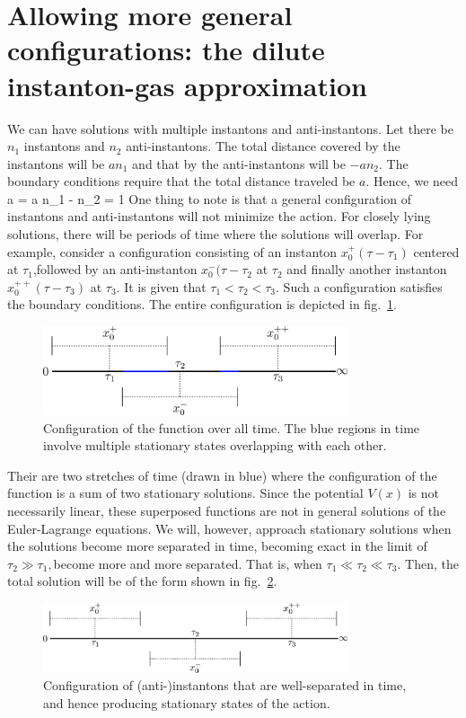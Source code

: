 \documentclass[12pt,onecolumn]{revtex4-2}
\begin{document}
\section{Allowing more general configurations: the dilute instanton-gas approximation}
We can have solutions with multiple instantons and anti-instantons. Let there be \(n_1\) instantons and \(n_2\) anti-instantons. The total distance covered by the instantons will be \(a n_1\) and that by the anti-instantons will be \(-a n_2\). The boundary conditions require that the total distance traveled be \(a\). Hence, we need 
\beq
 a  =  a \implies n_1 - n_2 = 1
\eeq
One thing to note is that a general configuration of instantons and anti-instantons will not minimize the action. For closely lying solutions, there will be periods of time where the solutions will overlap. For example, consider a configuration consisting of an instanton \(x_0^+(\tau - \tau_1)\) centered at \(\tau_1\),followed by an anti-instanton \(x_0^-(\tau - \tau_2\) at \(\tau_2\) and finally another instanton \(x_0^{++}(\tau - \tau_3)\) at \(\tau_3\). It is given that \(\tau_1 < \tau_2 < \tau_3\). Such a configuration satisfies the boundary conditions. The entire configuration is depicted in fig.~\ref{conf}.
\begin{figure}[htpb]
	\centering
	\includegraphics[width=0.8\textwidth]{./instantons.png}
	\caption{Configuration of the function over all time. The blue regions in time involve multiple stationary states overlapping with each other.}
	\label{conf}
\end{figure}
Their are two stretches of time (drawn in blue) where the configuration of the function is a sum of two stationary solutions. Since the potential \(V(x)\) is not necessarily linear, these superposed functions are not in general solutions of the Euler-Lagrange equations. We will, however, approach stationary solutions when the solutions become more separated in time, becoming exact in the limit of \(\tau_2 \gg \tau_1, \)become more and more separated. That is, when  \(\tau_1 \ll \tau_2 \ll \tau_3\). Then, the total solution will be of the form shown in fig.~\ref{conf2}.
\begin{figure}[htpb!]
	\centering
	\includegraphics[width=0.8\textwidth]{./instantons2.png}
	\caption{Configuration of (anti-)instantons that are well-separated in time, and hence producing stationary states of the action.}
	\label{conf2}
\end{figure}
\end{document}
